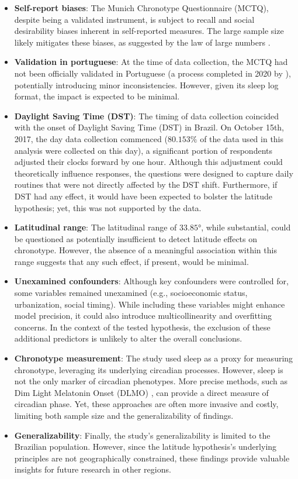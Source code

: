 \documentclass[
12pt,
openright,
oneside,
a4paper,
chapter=TITLE,
section=TITLE,
french,
spanish,
brazil,
english
]{abntex2}
\providecommand{\tightlist}{
\setlength{\itemsep}{0ex}\setlength{\parskip}{0\baselineskip}}
\begin{document}
\begin{itemize}
\tightlist
\item
  \textbf{Self-report biases}: The Munich Chronotype Questionnaire
  (MCTQ), despite being a validated instrument, is subject to recall and
  social desirability biases inherent in self-reported measures. The
  large sample size likely mitigates these biases, as suggested by the
  law of large numbers \autocite[352]{degroot2012a}.
\item
  \textbf{Validation in portuguese}: At the time of data collection, the
  MCTQ had not been officially validated in Portuguese (a process
  completed in 2020 by \textcite{reis2020a}), potentially introducing
  minor inconsistencies. However, given its sleep log format, the impact
  is expected to be minimal.
\item
  \textbf{Daylight Saving Time (DST)}: The timing of data collection
  coincided with the onset of Daylight Saving Time (DST) in Brazil. On
  October 15th, 2017, the day data collection commenced (\(80.153\%\) of
  the data used in this analysis were collected on this day), a
  significant portion of respondents adjusted their clocks forward by
  one hour. Although this adjustment could theoretically influence
  responses, the questions were designed to capture daily routines that
  were not directly affected by the DST shift. Furthermore, if DST had
  any effect, it would have been expected to bolster the latitude
  hypothesis; yet, this was not supported by the data.
\item
  \textbf{Latitudinal range}: The latitudinal range of \(33.85°\), while
  substantial, could be questioned as potentially insufficient to detect
  latitude effects on chronotype. However, the absence of a meaningful
  association within this range suggests that any such effect, if
  present, would be minimal.
\item
  \textbf{Unexamined confounders}: Although key confounders were
  controlled for, some variables remained unexamined (e.g.,
  socioeconomic status, urbanization, social timing). While including
  these variables might enhance model precision, it could also introduce
  multicollinearity and overfitting concerns. In the context of the
  tested hypothesis, the exclusion of these additional predictors is
  unlikely to alter the overall conclusions.
\item
  \textbf{Chronotype measurement}: The study used sleep as a proxy for
  measuring chronotype, leveraging its underlying circadian processes.
  However, sleep is not the only marker of circadian phenotypes. More
  precise methods, such as Dim Light Melatonin Onset (DLMO)
  \autocite{ruiz2020}, can provide a direct measure of circadian phase.
  Yet, these approaches are often more invasive and costly, limiting
  both sample size and the generalizability of findings.
\item
  \textbf{Generalizability}: Finally, the study's generalizability is
  limited to the Brazilian population. However, since the latitude
  hypothesis's underlying principles are not geographically constrained,
  these findings provide valuable insights for future research in other
  regions.
\end{itemize}
\end{document}
